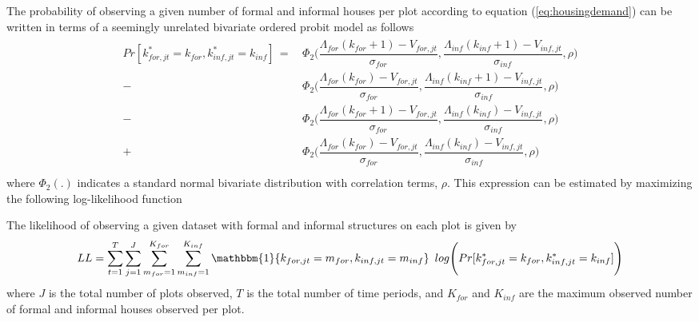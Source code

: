 \documentclass[12pt]{article}
\begin{document}
The probability of observing a given number of formal and informal houses per plot according to equation (\ref{eq:housingdemand}) can be written in terms of a seemingly unrelated bivariate ordered probit model as follows \citep{sajaia2008maximum}
\begin{align}
\label{eq:probfull}
\begin{split}
Pr[ k_{for,jt}^{*} =k_{for} , k_{inf,jt}^{*} =k_{inf} ] \, = \, &  \Phi_2\Bigg(\dfrac{\Lambda_{for}(k_{for}+1) -V_{for,jt} }{\sigma_{for}}, \dfrac{\Lambda_{inf}(k_{inf}+1) - V_{inf,jt}}{\sigma_{inf}} , \rho \Bigg) \\
- \, &\Phi_2\Bigg(\dfrac{\Lambda_{for}(k_{for}) - V_{for,jt} }{\sigma_{for}}, \dfrac{\Lambda_{inf}(k_{inf}+1) - V_{inf,jt} }{\sigma_{inf}} , \rho \Bigg) \\
- \, &\Phi_2\Bigg(\dfrac{\Lambda_{for}(k_{for}+1) - V_{for,jt}}{\sigma_{for}}, \dfrac{\Lambda_{inf}(k_{inf}) - V_{inf,jt}}{\sigma_{inf}} , \rho \Bigg) \\
+ \, &\Phi_2\Bigg(\dfrac{\Lambda_{for}(k_{for}) - V_{for,jt} }{\sigma_{for}}, \dfrac{\Lambda_{inf}(k_{inf}) - V_{inf,jt} }{\sigma_{inf}} , \rho \Bigg) \\
\end{split}
\end{align}
\noindent where $\Phi_{2}(.)$ indicates a standard normal bivariate distribution with correlation terms, $\rho$.  This expression can be estimated by maximizing the following log-likelihood function

The likelihood of observing a given dataset with formal and informal structures on each plot is given by
\begin{align}
\label{eq:demandll}
LL = \sum_{t=1}^{T} \sum_{j=1}^{J} \sum_{m_{for}=1}^{K_{for}} \sum_{m_{inf}=1}^{K_{inf}} \mathbbm{1} \{k_{for,jt} = m_{for}, k_{inf,jt} = m_{inf}\} \,\,\, log \Bigg( Pr[ k_{for,jt}^{*} =k_{for} , k_{inf,jt}^{*} =k_{inf} ] \Bigg)
\end{align}
\noindent where $J$ is the total number of plots observed, $T$ is the total number of time periods, and $K_{for}$ and $K_{inf}$ are the maximum observed number of formal and informal houses observed per plot.  
\end{document}
